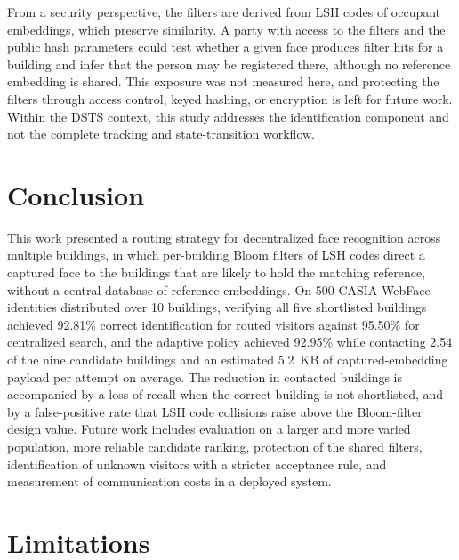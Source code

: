 \documentclass[pdflatex,sn-mathphys-num]{sn-jnl}%
\theoremstyle{thmstyleone}%
\theoremstyle{thmstyletwo}%
\theoremstyle{thmstylethree}%
\begin{document}
From a security perspective, the filters are derived from LSH codes of occupant embeddings, which preserve similarity. A party with access to the filters and the public hash parameters could test whether a given face produces filter hits for a building and infer that the person may be registered there, although no reference embedding is shared. This exposure was not measured here, and protecting the filters through access control, keyed hashing, or encryption is left for future work. Within the DSTS context, this study addresses the identification component and not the complete tracking and state-transition workflow.


\section{Conclusion}
\label{sec:conclusion}

This work presented a routing strategy for decentralized face recognition across multiple buildings, in which per-building Bloom filters of LSH codes direct a captured face to the buildings that are likely to hold the matching reference, without a central database of reference embeddings. On 500 CASIA-WebFace identities distributed over 10 buildings, verifying all five shortlisted buildings achieved 92.81\% correct identification for routed visitors against 95.50\% for centralized search, and the adaptive policy achieved 92.95\% while contacting 2.54 of the nine candidate buildings and an estimated 5.2~KB of captured-embedding payload per attempt on average. The reduction in contacted buildings is accompanied by a loss of recall when the correct building is not shortlisted, and by a false-positive rate that LSH code collisions raise above the Bloom-filter design value. Future work includes evaluation on a larger and more varied population, more reliable candidate ranking, protection of the shared filters, identification of unknown visitors with a stricter acceptance rule, and measurement of communication costs in a deployed system.


\section{Limitations}
\label{sec:limitations}
\end{document}
